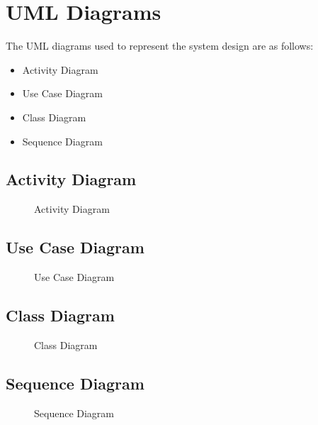 \chapter{UML Diagrams}

The UML diagrams used to represent the system design are as follows:
\begin{itemize}[leftmargin=1.4cm]
  \item Activity Diagram
  \item Use Case Diagram
  \item Class Diagram
  \item Sequence Diagram
\end{itemize}

\section{Activity Diagram}
\begin{figure}[H]
\centering
\resizebox{0.90\textwidth}{!}{}
\caption{Activity Diagram}
\end{figure}
\clearpage

\section{Use Case Diagram}
\begin{figure}[H]
\centering
\resizebox{0.95\textwidth}{!}{}
\caption{Use Case Diagram}
\end{figure}
\clearpage

\section{Class Diagram}
\begin{figure}[H]
\centering
\resizebox{0.95\textwidth}{!}{}
\caption{Class Diagram}
\end{figure}
\clearpage

\section{Sequence Diagram}
\begin{figure}[H]
\centering
\resizebox{0.95\textwidth}{!}{}
\caption{Sequence Diagram}
\end{figure}
